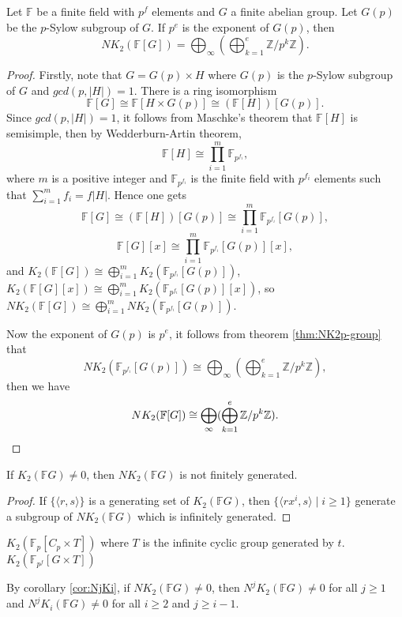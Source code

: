 \begin{theorem}
	Let $\mathbb{F}$ be a finite field with $p^f$ elements and $G$ a finite abelian group. Let $G(p)$ be the $p$-Sylow subgroup of $G$. If $p^e$ is the exponent of $G(p)$, then
	\[NK_2(\mathbb{F}[G]) =\bigoplus_{\infty}  (\bigoplus_{k=1}^e\mathbb{Z}/p^k\mathbb{Z}).\]
\end{theorem}
\begin{proof}
	Firstly, note that $G = G(p) \times H$ where $G(p)$ is the $p$-Sylow subgroup
of $G$ and $gcd(p, |H|)=1$. There is a ring isomorphism
\[\mathbb{F}[G] \cong \mathbb{F}[H \times G(p) ]\cong (\mathbb{F}[H])[G(p)].\]
Since $gcd(p, |H|)=1$, it follows from Maschke's theorem that $\mathbb{F}[H]$ is semisimple, then by Wedderburn-Artin
theorem, 
\[\mathbb{F}[H]\cong \prod_{i=1}^m\mathbb{F}_{p^{f_i}},\]
where $m$ is a positive integer and $\mathbb{F}_{p^{f_i}}$ is the finite field with $p^{f_i}$ elements such that $\sum_{i=1}^m f_i=f|H|$. Hence one gets 
\[\mathbb{F}[G] \cong (\mathbb{F}[H])[G(p)] \cong \prod_{i=1}^m\mathbb{F}_{p^{f_i}}[G(p)],\]
\[\mathbb{F}[G][x] \cong \prod_{i=1}^m\mathbb{F}_{p^{f_i}}[G(p)][x],\]
and $K_2(\mathbb{F}[G]) \cong \bigoplus_{i=1}^m K_2(\mathbb{F}_{p^{f_i}}[G(p)])$, $K_2(\mathbb{F}[G][x]) \cong \bigoplus_{i=1}^m K_2(\mathbb{F}_{p^{f_i}}[G(p)][x])$, so $NK_2(\mathbb{F}[G]) \cong \bigoplus_{i=1}^m NK_2(\mathbb{F}_{p^{f_i}}[G(p)])$.

Now the exponent of $G(p)$ is $p^e$, it follows from theorem \ref{thm:NK2p-group} that
\[NK_2(\mathbb{F}_{p^{f_i}}[G(p)])\cong \bigoplus_{\infty} (\bigoplus_{k=1}^e \mathbb{Z}/p^k\mathbb{Z}),\]
then we have 
\[NK_2(\mathbb{F}[G])\cong \bigoplus_{\infty} (\bigoplus_{k=1}^e \mathbb{Z}/p^k\mathbb{Z}).\qedhere \]
\end{proof}
\begin{corollary}
	If $K_2(\mathbb{F}G)\neq 0$, then $NK_2(\mathbb{F}G)$ is not finitely generated.
\end{corollary}
\begin{proof}
	If $\{\langle r,s\rangle\}$ is a generating set of $K_2(\mathbb{F}G)$, then $\{\langle rx^i,s\rangle \mid i\geq 1\}$ generate a subgroup of $NK_2(\mathbb{F}G)$ which is infinitely generated.
\end{proof}
\begin{corollary}
	$K_2(\mathbb{F}_p[C_p\times T])$ where $T$ is the infinite cyclic group generated by $t$.\\
	$K_2(\mathbb{F}_{p^f}[G\times T])$
\end{corollary}



By corollary \ref{cor:NjKi}, if $NK_2(\mathbb{F}G)\neq 0$, then $N^jK_2(\mathbb{F}G)\neq 0$ for all $j\geq 1$ and $N^jK_i(\mathbb{F}G)\neq 0$ for all $i \geq 2$ and $j \geq i - 1$.



